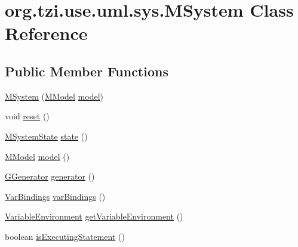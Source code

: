 \hypertarget{classorg_1_1tzi_1_1use_1_1uml_1_1sys_1_1_m_system}{\section{org.\-tzi.\-use.\-uml.\-sys.\-M\-System Class Reference}
\label{classorg_1_1tzi_1_1use_1_1uml_1_1sys_1_1_m_system}
}
\subsection*{Public Member Functions}
\begin{DoxyCompactItemize}
\item 
\hyperlink{classorg_1_1tzi_1_1use_1_1uml_1_1sys_1_1_m_system_a6f5a449fe743ddd73dd1b2b19a60b7bb}{M\-System} (\hyperlink{classorg_1_1tzi_1_1use_1_1uml_1_1mm_1_1_m_model}{M\-Model} \hyperlink{classorg_1_1tzi_1_1use_1_1uml_1_1sys_1_1_m_system_acb4fe3cd094adf436cb31a04e1838884}{model})
\item 
void \hyperlink{classorg_1_1tzi_1_1use_1_1uml_1_1sys_1_1_m_system_a232de61d94ec1fb374e0078197dea66c}{reset} ()
\item 
\hyperlink{classorg_1_1tzi_1_1use_1_1uml_1_1sys_1_1_m_system_state}{M\-System\-State} \hyperlink{classorg_1_1tzi_1_1use_1_1uml_1_1sys_1_1_m_system_a9174b9da876a3e569fab6255b20cb5db}{state} ()
\item 
\hyperlink{classorg_1_1tzi_1_1use_1_1uml_1_1mm_1_1_m_model}{M\-Model} \hyperlink{classorg_1_1tzi_1_1use_1_1uml_1_1sys_1_1_m_system_acb4fe3cd094adf436cb31a04e1838884}{model} ()
\item 
\hyperlink{classorg_1_1tzi_1_1use_1_1gen_1_1tool_1_1_g_generator}{G\-Generator} \hyperlink{classorg_1_1tzi_1_1use_1_1uml_1_1sys_1_1_m_system_af47c8cd0afeb2ee00dba5c8f9afb4fe1}{generator} ()
\item 
\hyperlink{classorg_1_1tzi_1_1use_1_1uml_1_1ocl_1_1value_1_1_var_bindings}{Var\-Bindings} \hyperlink{classorg_1_1tzi_1_1use_1_1uml_1_1sys_1_1_m_system_a089dc9ea0d3af9b1edaac1a1ecffec5b}{var\-Bindings} ()
\item 
\hyperlink{classorg_1_1tzi_1_1use_1_1util_1_1soil_1_1_variable_environment}{Variable\-Environment} \hyperlink{classorg_1_1tzi_1_1use_1_1uml_1_1sys_1_1_m_system_ad0fb9445099d4ebf903cd1cce9aaf78b}{get\-Variable\-Environment} ()
\item 
boolean \hyperlink{classorg_1_1tzi_1_1use_1_1uml_1_1sys_1_1_m_system_a9d488a82baa91991bf3e3d9b62a7d518}{is\-Executing\-Statement} ()
\item 

\end{DoxyCompactItemize}
